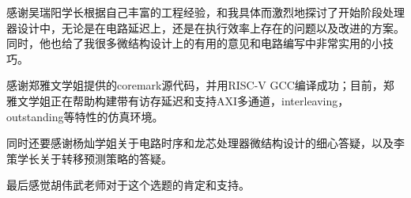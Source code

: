 
感谢吴瑞阳学长根据自己丰富的工程经验，和我具体而激烈地探讨了开始阶段处理器设计中，无论是在电路延迟上，还是在执行效率上存在的问题以及改进的方案。同时，他也给了我很多微结构设计上的有用的意见和电路编写中非常实用的小技巧。

感谢郑雅文学姐提供的coremark源代码，并用RISC-V GCC编译成功；目前，郑雅文学姐正在帮助构建带有访存延迟和支持AXI多通道，interleaving，outstanding等特性的仿真环境。

同时还要感谢杨灿学姐关于电路时序和龙芯处理器微结构设计的细心答疑，以及李策学长关于转移预测策略的答疑。

最后感觉胡伟武老师对于这个选题的肯定和支持。

\cleardoublepage[plain]%

